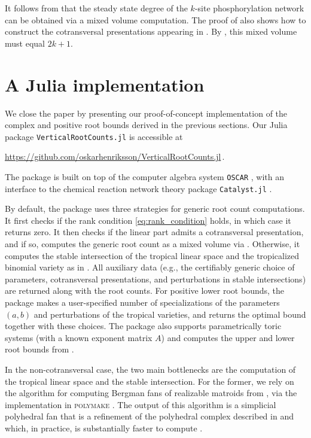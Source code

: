 \documentclass[11pt,reqno,a4paper]{amsart}
\numberwithin{equation}{section}
\theoremstyle{theoremstyle}
\theoremstyle{examplestyle}
\begin{document}
It follows from  that the steady state degree of the $k$-site phosphorylation network can be obtained via a mixed volume computation.
The proof of  also shows how to construct the cotransversal presentations appearing in .
By \cite{WangSontag}, this mixed volume must equal $2k+1$. 

\section{A Julia implementation}
\label{sec:implementation}
\noindent We close the paper by presenting our proof-of-concept implementation of the complex and positive root bounds derived in the previous sections. Our Julia package \texttt{VerticalRootCounts.jl} is accessible at
\begin{center}
\url{https://github.com/oskarhenriksson/VerticalRootCounts.jl}\,.
\end{center}
The package is built on top of the computer algebra system \texttt{OSCAR} \cite{OSCAR-book}, with an interface to the chemical reaction network theory package \texttt{Catalyst.jl} \cite{Catalyst}.


By default, the package uses three strategies for generic root count computations. It first checks if the rank condition \eqref{eq:rank_condition} holds, in which case it returns zero. It then checks if the linear part admits a cotransversal presentation, and if so, computes the generic root count as a mixed volume via . Otherwise, it computes the stable intersection of the tropical linear space and the tropicalized binomial variety as in . 
All auxiliary data (e.g., the certifiably generic choice of parameters, cotransversal presentations, and perturbations in stable intersections) are returned along with the root counts. 
For positive lower root bounds, the package makes a user-specified number of specializations of the parameters $(a,b)$ and perturbations of the tropical varieties, and returns the optimal bound together with these choices. The package also supports parametrically toric systems (with a known exponent matrix $A$) and computes the upper and lower root bounds from .


In the non-cotransversal case, the two main bottlenecks are the computation of the tropical linear space and the stable intersection. For the former, we rely on the algorithm for computing Bergman fans of realizable matroids from \cite{Rincon13}, via the implementation \cite{HampeJoswig17} in \textsc{polymake} \cite{polymake}. The output of this algorithm is a simplicial polyhedral fan that is a refinement of the polyhedral complex described in  and which, in practice, is substantially faster to compute \cite{HampeJoswigSchroeter:2019}. 
\end{document}
